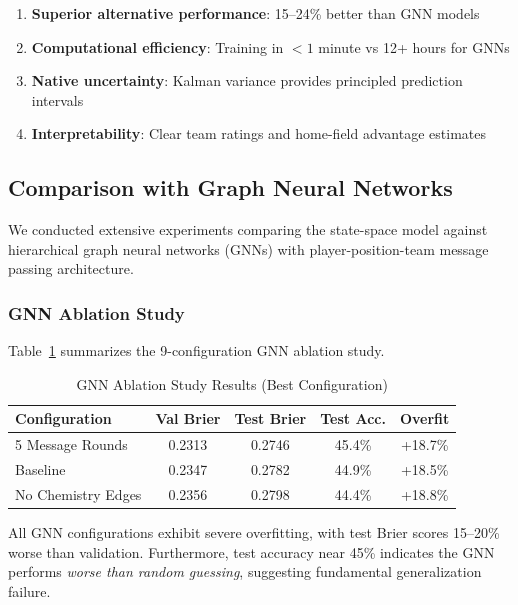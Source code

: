 \begin{enumerate}
    \item \textbf{Superior alternative performance}: 15--24\% better than GNN models
    \item \textbf{Computational efficiency}: Training in $<1$ minute vs 12+ hours for GNNs
    \item \textbf{Native uncertainty}: Kalman variance provides principled prediction intervals
    \item \textbf{Interpretability}: Clear team ratings and home-field advantage estimates
\end{enumerate}

\subsection{Comparison with Graph Neural Networks}

We conducted extensive experiments comparing the state-space model against hierarchical graph neural networks (GNNs) with player-position-team message passing architecture.

\subsubsection{GNN Ablation Study}

Table~\ref{tab:gnn-ablation-results} summarizes the 9-configuration GNN ablation study.

\begin{table}[htbp]
\centering
\caption{GNN Ablation Study Results (Best Configuration)}
\label{tab:gnn-ablation-results}
\begin{tabular}{lcccc}
\toprule
\textbf{Configuration} & \textbf{Val Brier} & \textbf{Test Brier} & \textbf{Test Acc.} & \textbf{Overfit} \\
\midrule
5 Message Rounds & 0.2313 & 0.2746 & 45.4\% & +18.7\% \\
Baseline & 0.2347 & 0.2782 & 44.9\% & +18.5\% \\
No Chemistry Edges & 0.2356 & 0.2798 & 44.4\% & +18.8\% \\
\bottomrule
\end{tabular}
\end{table}

All GNN configurations exhibit severe overfitting, with test Brier scores 15--20\% worse than validation. Furthermore, test accuracy near 45\% indicates the GNN performs \textit{worse than random guessing}, suggesting fundamental generalization failure.

